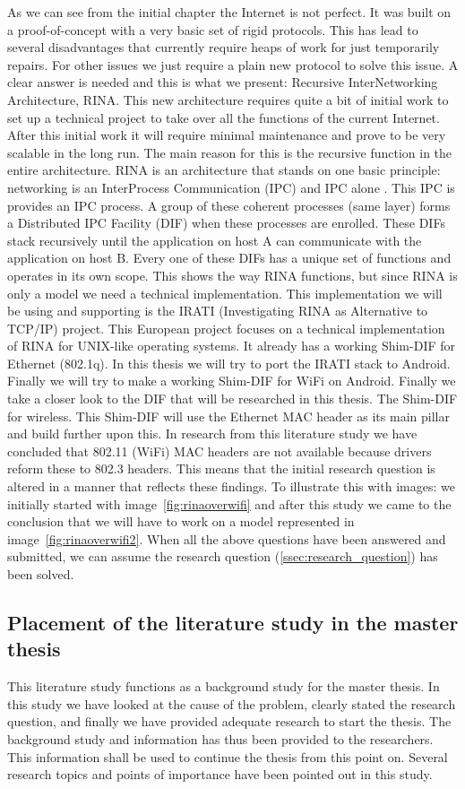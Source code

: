 As we can see from the initial chapter the Internet is not perfect. It was built on a proof-of-concept with a very basic set of rigid protocols. This has lead to several disadvantages that currently require heaps of work for just temporarily repairs. For other issues we just require a plain new protocol to solve this issue. A clear answer is needed and this is what we present: Recursive InterNetworking Architecture, RINA. This new architecture requires quite a bit of initial work to set up a technical project to take over all the functions of the current Internet. After this initial work it will require minimal maintenance and prove to be very scalable in the long run. The main reason for this is the recursive function in the entire architecture.
\npar
RINA is an architecture that stands on one basic principle: networking is an InterProcess Communication (IPC) and IPC alone \citep{johnday2008}. This IPC is provides an IPC process. A group of these coherent processes (same layer) forms a Distributed IPC Facility (DIF) when these processes are enrolled. These DIFs stack recursively until the application on host A can communicate with the application on host B. Every one of these DIFs has a unique set of functions and operates in its own scope. 
\npar
This shows the way RINA functions, but since RINA is only a model we need a technical implementation. This implementation we will be using and supporting is the IRATI (Investigating RINA as Alternative to TCP/IP) project. This European project focuses on a technical implementation of RINA for UNIX-like operating systems. It already has a working Shim-DIF for Ethernet (802.1q). In this thesis we will try to port the IRATI stack to Android. Finally we will try to make a working Shim-DIF for WiFi on Android. 
\npar
Finally we take a closer look to the DIF that will be researched in this thesis. The Shim-DIF for wireless. This Shim-DIF will use the Ethernet MAC header as its main pillar and build further upon this. In research from this literature study we have concluded that 802.11 (WiFi) MAC headers are not available because drivers reform these to 802.3 headers. This means that the initial research question is altered in a manner that reflects these findings. To illustrate this with images: we initially started with image~\ref{fig:rinaoverwifi} and after this study we came to the conclusion that we will have to work on a model represented in image~\ref{fig:rinaoverwifi2}. When all the above questions have been answered and submitted, we can assume the research question (\ref{ssec:research_question}) has been solved.

\subsection{Placement of the literature study in the master thesis}

This literature study functions as a background study for the master thesis. In this study we have looked at the cause of the problem, clearly stated the research question, and finally we have provided adequate research to start the thesis. The background study and information has thus been provided to the researchers. This information shall be used to continue the thesis from this point on. Several research topics and points of importance have been pointed out in this study. 
